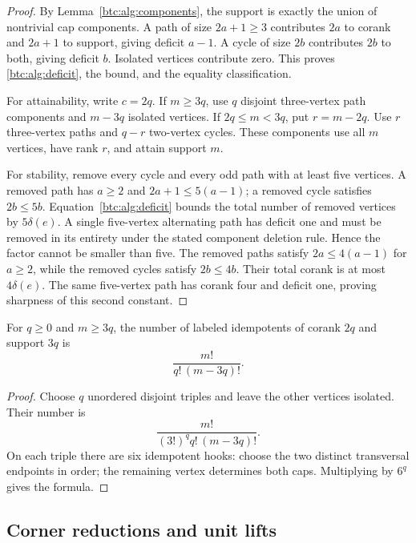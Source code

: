 \begin{proof}
By Lemma~\ref{btc:alg:components}, the support is exactly the union of
nontrivial cap components. A path of size $2a+1\ge3$ contributes
$2a$ to corank and $2a+1$ to support, giving deficit $a-1$.
A cycle of size $2b$ contributes $2b$ to both, giving deficit $b$.
Isolated vertices contribute zero. This proves
\eqref{btc:alg:deficit}, the bound, and the equality classification.

For attainability, write $c=2q$. If $m\ge3q$, use $q$ disjoint
three-vertex path components and $m-3q$ isolated vertices. If
$2q\le m<3q$, put $r=m-2q$. Use $r$ three-vertex paths and
$q-r$ two-vertex cycles. These components use all $m$ vertices,
have rank $r$, and attain support $m$.

For stability, remove every cycle and every odd path with at least
five vertices. A removed path has $a\ge2$ and
$2a+1\le5(a-1)$; a removed cycle satisfies $2b\le5b$.
Equation~\eqref{btc:alg:deficit} bounds the total number of removed
vertices by $5\delta(e)$. A single five-vertex alternating path
has deficit one and must be removed in its entirety under the stated
component deletion rule. Hence the factor cannot be smaller than five.
The removed paths satisfy $2a\le4(a-1)$ for $a\ge2$, while the
removed cycles satisfy $2b\le4b$. Their total corank is at most
$4\delta(e)$. The same five-vertex path has corank four and
deficit one, proving sharpness of this second constant.
\end{proof}

\begin{corollary}\label{btc:alg:support-count}
For $q\ge0$ and $m\ge3q$, the number of labeled idempotents of
corank $2q$ and support $3q$ is
\begin{equation}\label{btc:alg:maximizer-count}
 \frac{m!}{q!\,(m-3q)!}.
\end{equation}
\end{corollary}

\begin{proof}
Choose $q$ unordered disjoint triples and leave the other vertices
isolated. Their number is
\[
 \frac{m!}{(3!)^q q!\,(m-3q)!}.
\]
On each triple there are six idempotent hooks: choose the two distinct transversal
endpoints in order; the remaining vertex determines both caps.
Multiplying by $6^q$ gives the formula.
\end{proof}

\subsection{Corner reductions and unit lifts}
\label{btc:alg:corners-section}

